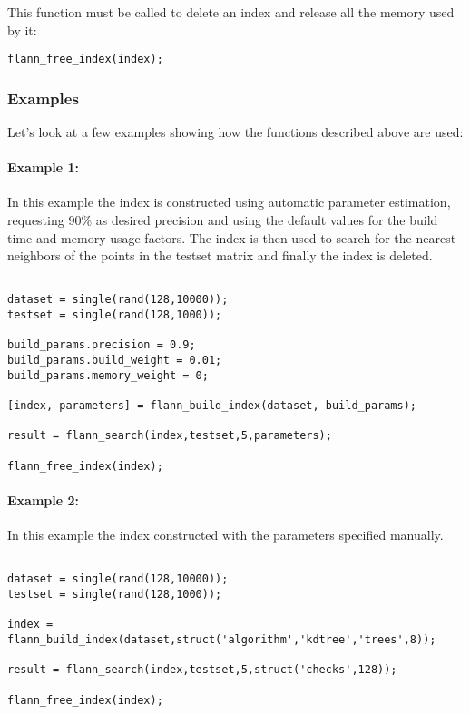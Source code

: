 \documentclass[letter,10pt]{article}
\begin{document}
This function must be called to delete an index and release all the memory
used by it:
\begin{Verbatim}
flann_free_index(index);
\end{Verbatim}

\subsubsection{Examples}

Let's look at a few examples showing how the functions described above are
used:

\paragraph{Example 1:}

In this example the index is constructed using automatic parameter estimation, requesting 90\% as desired precision and using the default values for the build time and memory usage factors. The index is then used to search for the nearest-neighbors of the points in the testset matrix and finally the index is deleted.

\begin{Verbatim}[fontsize=\footnotesize,frame=single]

dataset = single(rand(128,10000));
testset = single(rand(128,1000));

build_params.precision = 0.9;
build_params.build_weight = 0.01;
build_params.memory_weight = 0;

[index, parameters] = flann_build_index(dataset, build_params);

result = flann_search(index,testset,5,parameters);

flann_free_index(index);

\end{Verbatim}




% 
% 


\paragraph{Example 2:}

In this example the index constructed with the parameters specified manually.

\begin{Verbatim}[fontsize=\footnotesize,frame=single]

dataset = single(rand(128,10000));
testset = single(rand(128,1000));

index = flann_build_index(dataset,struct('algorithm','kdtree','trees',8));

result = flann_search(index,testset,5,struct('checks',128));

flann_free_index(index);

\end{Verbatim}
\end{document}
